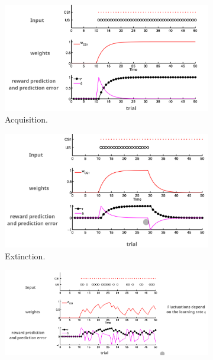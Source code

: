 \documentclass[11pt]{book} %
\begin{document}
\begin{figure}[ht]
    \begin{subfigure}[b]{0.33\textwidth}
        \centering
        \includegraphics[width=\textwidth]{./Figs/acquisiton_exp.jpeg}
        \caption{Acquisition.}
        \label{fig:rescorla_wagner}
    \end{subfigure}
    \begin{subfigure}[b]{0.31\textwidth}
        \centering
        \includegraphics[width=\textwidth]{./Figs/extinction_exp.jpeg}
        \caption{Extinction.}
        \label{fig:overshadowing}
    \end{subfigure}
    \begin{subfigure}[b]{0.31\textwidth}
        \centering
        \includegraphics[width=\textwidth]{./Figs/partial_exp.jpeg}

\end{subfigure}
\end{figure}
\end{document}
